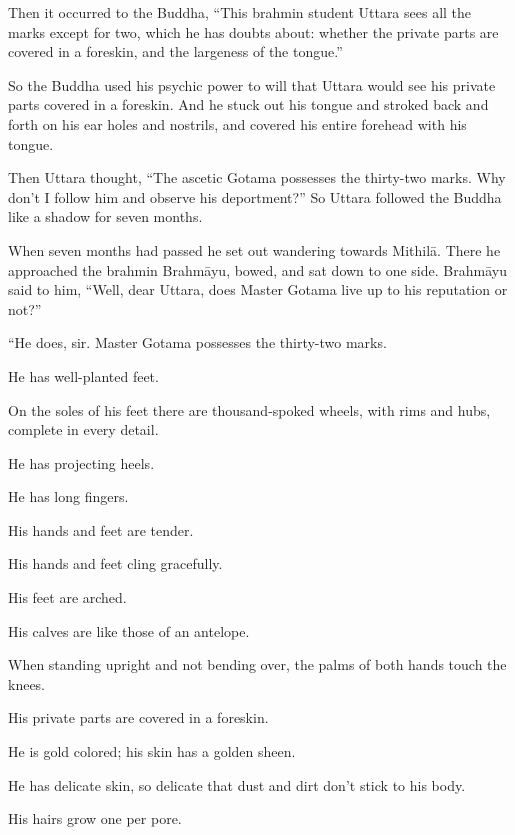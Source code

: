 \documentclass[12pt,openany]{book}%
\begin{document}
Then it occurred to the Buddha, “This brahmin student Uttara sees all the marks except for two, which he has doubts about: whether the private parts are covered in a foreskin, and the largeness of the tongue.” 

So the Buddha used his psychic power to will that Uttara would see his private parts covered in a foreskin. And he stuck out his tongue and stroked back and forth on his ear holes and nostrils, and covered his entire forehead with his tongue. 

Then Uttara thought, “The ascetic Gotama possesses the thirty-two marks. Why don’t I follow him and observe his deportment?” So Uttara followed the Buddha like a shadow for seven months. 

When seven months had passed he set out wandering towards \textsanskrit{Mithilā}. There he approached the brahmin \textsanskrit{Brahmāyu}, bowed, and sat down to one side. \textsanskrit{Brahmāyu} said to him, “Well, dear Uttara, does Master Gotama live up to his reputation or not?” 

“He does, sir. Master Gotama possesses the thirty-two marks. 

He has well-planted feet. 

On the soles of his feet there are thousand-spoked wheels, with rims and hubs, complete in every detail. 

He has projecting heels. 

He has long fingers. 

His hands and feet are tender. 

His hands and feet cling gracefully. 

His feet are arched. 

His calves are like those of an antelope. 

When standing upright and not bending over, the palms of both hands touch the knees. 

His private parts are covered in a foreskin. 

He is gold colored; his skin has a golden sheen. 

He has delicate skin, so delicate that dust and dirt don’t stick to his body. 

His hairs grow one per pore. 
\end{document}
